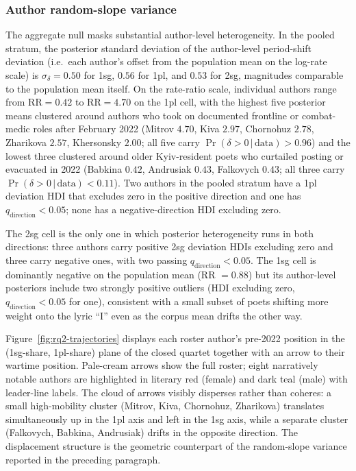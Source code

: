 \documentclass[12pt]{interact}
\theoremstyle{plain}%
\theoremstyle{definition}
\theoremstyle{remark}
\begin{document}
\subsubsection{Author random-slope variance}

The aggregate null masks substantial author-level heterogeneity. In the pooled stratum, the posterior standard deviation of the author-level period-shift deviation (i.e.\ each author's offset from the population mean on the log-rate scale) is $\sigma_{\delta} = 0.50$ for 1sg, $0.56$ for 1pl, and $0.53$ for 2sg, magnitudes comparable to the population mean itself. On the rate-ratio scale, individual authors range from $\mathrm{RR} = 0.42$ to $\mathrm{RR} = 4.70$ on the 1pl cell, with the highest five posterior means clustered around authors who took on documented frontline or combat-medic roles after February 2022 (Mitrov $4.70$, Kiva $2.97$, Chornohuz $2.78$, Zharikova $2.57$, Khersonsky $2.00$; all five carry $\Pr(\delta > 0\,|\,\text{data}) > 0.96$) and the lowest three clustered around older Kyiv-resident poets who curtailed posting or evacuated in 2022 (Babkina $0.42$, Andrusiak $0.43$, Falkovych $0.43$; all three carry $\Pr(\delta > 0\,|\,\text{data}) < 0.11$). Two authors in the pooled stratum have a 1pl deviation HDI that excludes zero in the positive direction and one has $q_{\text{direction}} < 0.05$; none has a negative-direction HDI excluding zero.

The 2sg cell is the only one in which posterior heterogeneity runs in both directions: three authors carry positive 2sg deviation HDIs excluding zero and three carry negative ones, with two passing $q_{\text{direction}} < 0.05$. The 1sg cell is dominantly negative on the population mean (RR $= 0.88$) but its author-level posteriors include two strongly positive outliers (HDI excluding zero, $q_{\text{direction}} < 0.05$ for one), consistent with a small subset of poets shifting more weight onto the lyric ``I'' even as the corpus mean drifts the other way.

Figure~\ref{fig:rq2-trajectories} displays each roster author's pre-2022 position in the (1sg-share, 1pl-share) plane of the closed quartet together with an arrow to their wartime position. Pale-cream arrows show the full roster; eight narratively notable authors are highlighted in literary red (female) and dark teal (male) with leader-line labels. The cloud of arrows visibly disperses rather than coheres: a small high-mobility cluster (Mitrov, Kiva, Chornohuz, Zharikova) translates simultaneously up in the 1pl axis and left in the 1sg axis, while a separate cluster (Falkovych, Babkina, Andrusiak) drifts in the opposite direction. The displacement structure is the geometric counterpart of the random-slope variance reported in the preceding paragraph.
\end{document}
